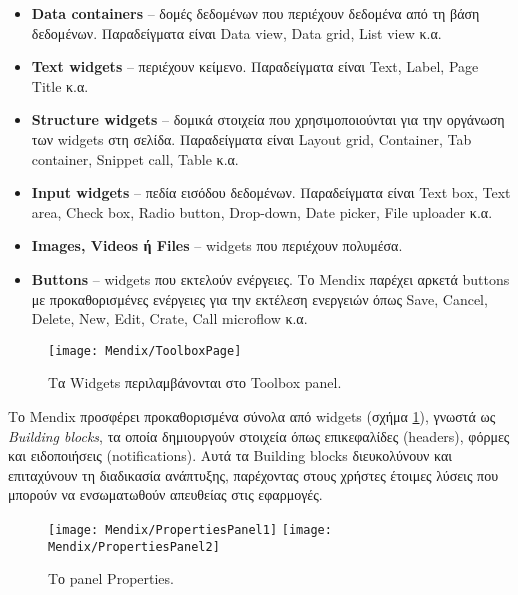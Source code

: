                 \begin{itemize}[label={\tiny \blacksquare}]
                    \setlength\itemsep{-0.25em}
                    \item \textbf{Data containers} -- δομές δεδομένων που περιέχουν δεδομένα από τη βάση δεδομένων. Παραδείγματα είναι Data view, Data grid, List view κ.α.
                    \item \textbf{Text widgets} -- περιέχουν κείμενο. Παραδείγματα είναι Text, Label, Page Title κ.α.
                    \item \textbf{Structure widgets} -- δομικά στοιχεία που χρησιμοποιούνται για την οργάνωση των widgets στη σελίδα. Παραδείγματα είναι Layout grid, Container, Tab container, Snippet call, Table κ.α.
                    \item \textbf{Input widgets} -- πεδία εισόδου δεδομένων. Παραδείγματα είναι Text box, Text area, Check box, Radio button, Drop-down, Date picker, File uploader κ.α.
                    \item \textbf{Images, Videos ή Files} -- widgets που περιέχουν πολυμέσα.
                    \item \textbf{Buttons} -- widgets που εκτελούν ενέργειες. Το Mendix παρέχει αρκετά buttons με προκαθορισμένες ενέργειες για την εκτέλεση ενεργειών όπως Save, Cancel, Delete, New, Edit, Crate, Call microflow κ.α.
                \end{itemize}

            \begin{figure}[h!] \noindent \centering
                \texttt{[image: Mendix/ToolboxPage]}
                \caption{\centering Τα Widgets περιλαμβάνονται στο Toolbox panel.}
                \label{fig:MendixToolboxPage}
            \end{figure}

                Tο Mendix προσφέρει προκαθορισμένα σύνολα από widgets (σχήμα \ref{fig:MendixToolboxPage}), γνωστά ως \textit{Building blocks}, τα οποία δημιουργούν στοιχεία όπως επικεφαλίδες (headers), φόρμες και ειδοποιήσεις (notifications). Αυτά τα Building blocks διευκολύνουν και επιταχύνουν τη διαδικασία ανάπτυξης, παρέχοντας στους χρήστες έτοιμες λύσεις που μπορούν να ενσωματωθούν απευθείας στις εφαρμογές.

                \begin{figure}[h!] \noindent \centering
                    \texttt{[image: Mendix/PropertiesPanel1]}
                    \texttt{[image: Mendix/PropertiesPanel2]}
                    \caption{\centering Το panel Properties.}
                    \label{fig:MendixPropertiesPanel}
                \end{figure}

